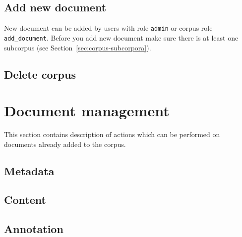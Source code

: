 \documentclass[a4paper,10pt,oneside]{scrbook}
\begin{document}
\section{Add new document}

New document can be added by users with role \verb|admin| or corpus role \verb|add_document|. Before you add new document make sure there is at least one subcorpus (see Section~\ref{sec:corpus-subcorpora}).

\section{Delete corpus}


\chapter{Document management}
This section contains description of actions which can be performed on documents already added to the corpus.

\section{Metadata}


\section{Content}


\section{Annotation}
\end{document}
